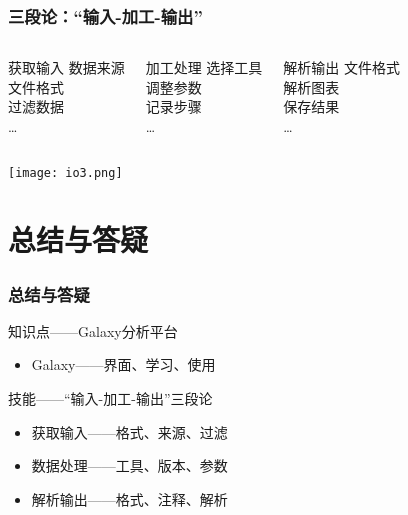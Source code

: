 \begin{frame}
  \frametitle{三段论：“输入-加工-输出”}
  \begin{columns}
    \begin{block}{获取输入}
      数据来源\\ 文件格式\\ 过滤数据\\ \ldots
    \end{block}
    \begin{block}{加工处理}
      选择工具\\ 调整参数\\ 记录步骤\\ \ldots
    \end{block}
    \begin{block}{解析输出}
      文件格式\\ 解析图表\\ 保存结果\\ \ldots
    \end{block}
  \end{columns}
  \begin{center}
    \texttt{[image: io3.png]}
  \end{center}
\end{frame}

\section{总结与答疑}
\begin{frame}
  \frametitle{总结与答疑}
  \begin{block}{知识点——Galaxy分析平台}
    \begin{itemize}
      \item Galaxy——界面、学习、使用
    \end{itemize}
  \end{block}
  \begin{block}{技能——“输入-加工-输出”三段论}
    \begin{itemize}
      \item 获取输入——格式、来源、过滤
      \item 数据处理——工具、版本、参数
      \item 解析输出——格式、注释、解析
    \end{itemize}
  \end{block}
\end{frame}

